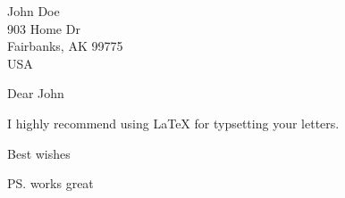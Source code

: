\documentclass[english]{UAFletter}
\begin{document}
\begin{letter}
  {John Doe \\
    903 Home Dr \\
    Fairbanks, AK 99775 \\
    USA  \\
  }
  
  \opening{Dear John}
  
  I highly recommend using \LaTeX{} for typsetting your letters. 

  \closing{Best wishes}
  
  
  \ps{works great}
  
\end{letter}
\end{document}
